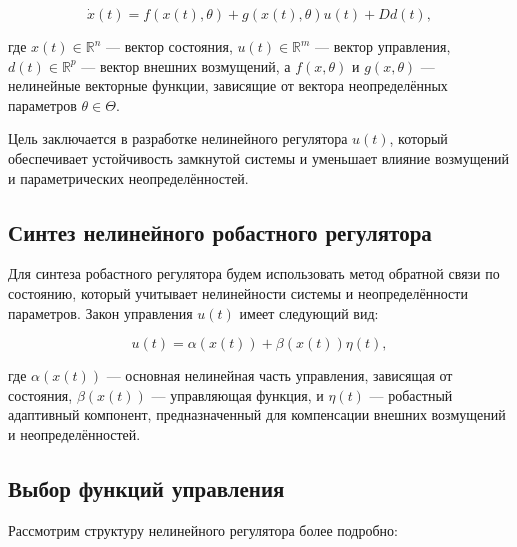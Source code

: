 \documentclass[a4paper,14pt]{extarticle} %
\begin{document}
\begin{equation}
    \dot{x}(t) = f(x(t), \theta) + g(x(t), \theta)u(t) + Dd(t),
\end{equation}

где \( x(t) \in \mathbb{R}^n \) — вектор состояния, \( u(t) \in \mathbb{R}^m \) — вектор управления, \( d(t) \in \mathbb{R}^p \) — вектор внешних возмущений, а \( f(x, \theta) \) и \( g(x, \theta) \) — нелинейные векторные функции, зависящие от вектора неопределённых параметров \( \theta \in \Theta \).

Цель заключается в разработке нелинейного регулятора \( u(t) \), который обеспечивает устойчивость замкнутой системы и уменьшает влияние возмущений и параметрических неопределённостей.

\subsection*{Синтез нелинейного робастного регулятора}

Для синтеза робастного регулятора будем использовать метод обратной связи по состоянию, который учитывает нелинейности системы и неопределённости параметров. Закон управления \( u(t) \) имеет следующий вид:

\begin{equation}
    u(t) = \alpha(x(t)) + \beta(x(t))\eta(t),
\end{equation}

где \( \alpha(x(t)) \) — основная нелинейная часть управления, зависящая от состояния, \( \beta(x(t)) \) — управляющая функция, и \( \eta(t) \) — робастный адаптивный компонент, предназначенный для компенсации внешних возмущений и неопределённостей.

\subsection*{Выбор функций управления}

Рассмотрим структуру нелинейного регулятора более подробно:
\end{document}
